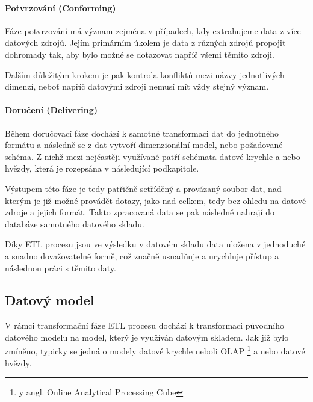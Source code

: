 \documentclass[
  digital,     %
  twoside,     %
  lof,         %
  lot,         %
]{fithesis4}
\begin{document}
\paragraph{Potvrzování (Conforming)}
Fáze potvrzování má význam zejména v případech, kdy extrahujeme data z více datových zdrojů. Jejím primárním úkolem je data z různých zdrojů propojit dohromady tak, aby bylo možné se dotazovat napříč všemi těmito zdroji. \parencite[s.~19]{Kimballc2004}

Dalším důležitým krokem je pak kontrola konfliktů mezi názvy jednotlivých dimenzí, neboť napříč datovými zdroji nemusí mít vždy stejný význam. \parencite{Kimballc2004}

\paragraph{Doručení (Delivering)}
Během doručovací fáze dochází k samotné transformaci dat do jednotného formátu a následně se z dat vytvoří dimenzionální model, nebo požadované schéma. Z nichž mezi nejčastěji využívané patří schémata datové krychle a nebo hvězdy, která je rozepsána v následující podkapitole.\parencite[s.~19]{Kimballc2004}

Výstupem této fáze je tedy patřičně setříděný a provázaný soubor dat, nad kterým je již možné provádět dotazy, jako nad celkem, tedy bez ohledu na datové zdroje a jejich formát. Takto zpracovaná data se pak následně nahrají do databáze samotného datového skladu.

Díky ETL procesu jsou ve výsledku v datovém skladu data uložena v jednoduché a snadno dovažovatelně formě, což značně usnadňuje a urychluje přístup a následnou práci s těmito daty.

\subsection{Datový model}
V rámci transformační fáze ETL procesu dochází k transformaci původního datového modelu na model, který je využíván datovým skladem. Jak již bylo zmíněno, typicky se jedná o modely datové krychle neboli OLAP \footnote{y angl. Online Analytical Processing Cube} a nebo datové hvězdy. 
\end{document}
